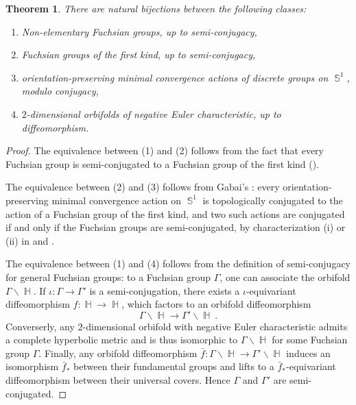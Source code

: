 \documentclass{amsart}
\theoremstyle{plain}
\newtheorem{theorem}[proposition]{Theorem}
\theoremstyle{definition}
\DeclareMathOperator{\Hb}{\mathbb{H}}
\DeclareMathOperator{\Sb}{\mathbb{S}}
\newcommand{\1}{\mathbf{1}}
\begin{document}
\begin{theorem}
\label{thm: informal theorem semi-conjugacy}
    There are natural bijections between the following classes:
    \begin{enumerate}
        \item Non-elementary Fuchsian groups, up to semi-conjugacy,
        \item Fuchsian groups of the first kind, up to semi-conjugacy,
        \item orientation-preserving minimal convergence actions of discrete groups on $\Sb^1$, modulo conjugacy,
        \item $2$-dimensional orbifolds of negative Euler characteristic, up to diffeomorphism.
    \end{enumerate}
\end{theorem}

\begin{proof}
The equivalence between (1) and (2) follows from the fact that every Fuchsian group is semi-conjugated to a Fuchsian group of the first kind ().

The equivalence between (2) and (3) follows from Gabai's : every orientation-preserving minimal convergence action on $\Sb^1$ is topologically conjugated to the action of a Fuchsian group of the first kind, and two such actions are conjugated if and only if the Fuchsian groups are semi-conjugated, by characterization (i) or (ii) in  and .

The equivalence between (1) and (4) follows from the definition of semi-conjugacy for general Fuchsian groups: to a Fuchsian group $\Gamma$, one can associate the orbifold $\Gamma \backslash \Hb$. If $\iota: \Gamma\to \Gamma'$ is a semi-conjugation, there exists a $\iota$-equivariant diffeomorphism $f: \Hb\to \Hb$, which factors to an orbifold diffeomorphism
\[\Gamma \backslash \Hb \to \Gamma' \backslash \Hb~.\]
Converserly, any $2$-dimensional orbifold with negative Euler characteristic admits a complete hyperbolic metric and is thus isomorphic to $\Gamma \backslash \Hb$ for some Fuchsian group $\Gamma$. Finally, any orbifold diffeomorphism $\bar f: \Gamma \backslash \Hb \to \Gamma' \backslash \Hb$ induces an isomorphism $\bar f_*$ between their fundamental groups and lifts to a $\bar f_*$-equivariant diffeomorphism between their universal covers. Hence $\Gamma$ and $\Gamma'$ are semi-conjugated.
\end{proof}
\end{document}

